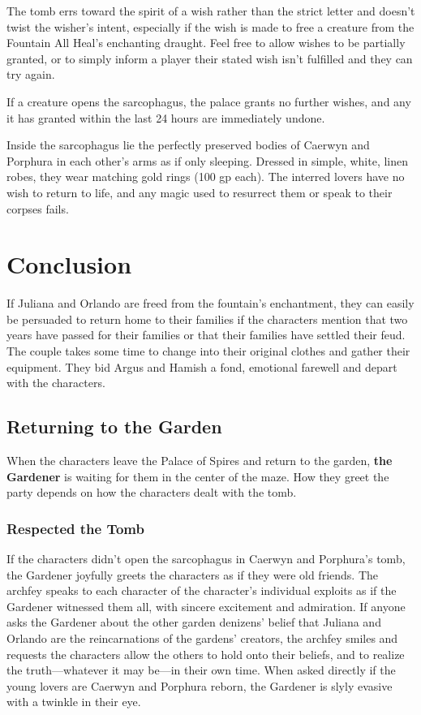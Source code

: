 \documentclass[10pt,a4paper,twoside,bg=print,twocolumn,openany,nodeprecatedcode]{dndbook}
\begin{document}
The tomb errs toward the spirit of a wish rather than the strict letter and doesn't twist the wisher's intent, especially if the wish is made to free a creature from the Fountain All Heal's enchanting draught. Feel free to allow wishes to be partially granted, or to simply inform a player their stated wish isn't fulfilled and they can try again.

If a creature opens the sarcophagus, the palace grants no further wishes, and any it has granted within the last 24 hours are immediately undone.

Inside the sarcophagus lie the perfectly preserved bodies of Caerwyn and Porphura in each other's arms as if only sleeping. Dressed in simple, white, linen robes, they wear matching gold rings (100 gp each). The interred lovers have no wish to return to life, and any magic used to resurrect them or speak to their corpses fails.

\section{Conclusion}
If Juliana and Orlando are freed from the fountain's enchantment, they can easily be persuaded to return home to their families if the characters mention that two years have passed for their families or that their families have settled their feud. The couple takes some time to change into their original clothes and gather their equipment. They bid Argus and Hamish a fond, emotional farewell and depart with the characters.

\subsection{Returning to the Garden}
When the characters leave the Palace of Spires and return to the garden, \textbf{the Gardener} is waiting for them in the center of the maze. How they greet the party depends on how the characters dealt with the tomb.

\subsubsection{Respected the Tomb}
If the characters didn't open the sarcophagus in Caerwyn and Porphura's tomb, the Gardener joyfully greets the characters as if they were old friends. The archfey speaks to each character of the character's individual exploits as if the Gardener witnessed them all, with sincere excitement and admiration. If anyone asks the Gardener about the other garden denizens' belief that Juliana and Orlando are the reincarnations of the gardens' creators, the archfey smiles and requests the characters allow the others to hold onto their beliefs, and to realize the truth—whatever it may be—in their own time. When asked directly if the young lovers are Caerwyn and Porphura reborn, the Gardener is slyly evasive with a twinkle in their eye.
\end{document}
